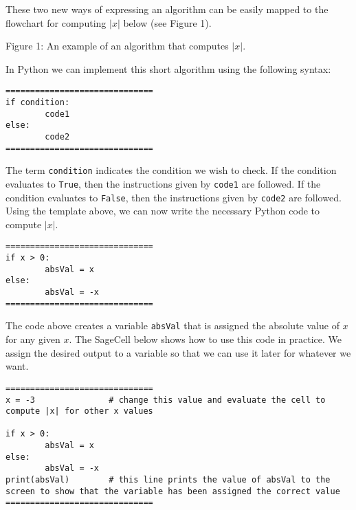 \documentclass{ximera}
\begin{document}
These two new ways of expressing an algorithm can be easily mapped to the flowchart for computing $|x|$ below (see Figure 1).

\begin{center}
\end{center}
\begin{center}
    Figure 1: An example of an algorithm that computes $|x|$.
\end{center}


In Python we can implement this short algorithm using the following syntax:

\begin{verbatim}
==============================
if condition:
        code1
else:
        code2
==============================
\end{verbatim}

The term \verb|condition| indicates the condition we wish to check. If the condition evaluates to \verb|True|, then the instructions given by \verb|code1| are followed. If the condition evaluates to \verb|False|, then the instructions given by \verb|code2| are followed. Using the template above, we can now write the necessary Python code to compute $|x|$.

\begin{verbatim}
==============================
if x > 0:
        absVal = x
else:
        absVal = -x
==============================
\end{verbatim}

The code above creates a variable \verb|absVal| that is assigned the absolute value of $x$ for any given $x$. The SageCell below shows how to use this code in practice. We assign the desired output to a variable so that we can use it later for whatever we want.

\begin{verbatim}
==============================
x = -3               # change this value and evaluate the cell to compute |x| for other x values

if x > 0:
        absVal = x
else:
        absVal = -x
print(absVal)        # this line prints the value of absVal to the screen to show that the variable has been assigned the correct value
==============================
\end{verbatim}
\end{document}
